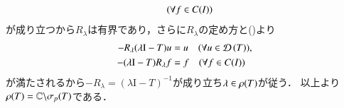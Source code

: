 \begin{prf}
\begin{description}
\begin{align}
					\quad (\forall f \in C(I))
				\end{align}
				が成り立つから$R_\lambda$は有界であり，さらに$R_\lambda$の定め方と()より
				\begin{align}
					-R_\lambda (\lambda \mathrm{I} - T) u &= u \quad (\forall u \in \Dom{T} ), \\
					-(\lambda \mathrm{I} - T) R_\lambda f &= f \quad (\forall f \in \c{I})
				\end{align}
				が満たされるから$-R_\lambda = (\lambda \mathrm{I} - T)^{-1}$が成り立ち$\lambda \in \mathfrak{\rho} (T) $が従う．
				以上より$\mathfrak{\rho} (T) = \mathbb{C} \backslash \mathfrak{\sigma}_p (T) $である．
				\QED
		\end{description}
	\end{prf}